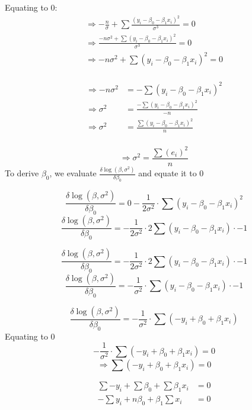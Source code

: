 \documentclass[
]{article}
\begin{document}
Equating to \(0\): \begin{align*}
  \Rightarrow -\frac{n}{\sigma} + \sum \frac{(y_i - \beta_0 - \beta_1 x_i)^2}{\sigma^3}
   =
  0 \\
  \Rightarrow \frac{-n\sigma^2  + \sum (y_i - \beta_0 - \beta_1 x_i)^2}{\sigma^3} 
   =
  0 \\
  \Rightarrow -n\sigma^2  + \sum (y_i - \beta_0 - \beta_1 x_i)^2
  =
  0 \\
\end{align*}

\begin{align*}
  \Rightarrow -n\sigma^2  
   & = 
   -\sum (y_i - \beta_0 - \beta_1 x_i)^2 \\
  
  \Rightarrow \sigma^2  
   & =
  \frac{-\sum (y_i - \beta_0 - \beta_1 x_i)^2}{-n} \\
  
  \Rightarrow \sigma^2  
   & =
  \frac{\sum (y_i - \beta_0 - \beta_1 x_i)^2}{n} \\
\end{align*}

\[
\boxed  {\Rightarrow \sigma^2  
    =
  \frac{\sum(e_i)^2}{n}
}
\] To derive \(\beta_0\), we evaluate
\(\frac{\delta\log(\beta,\sigma^2)}{\delta\beta_0}\) and equate it to
\(0\)

\[
\frac{\delta\log(\beta,\sigma^2)}{\delta\beta_0} 
=
0 - \frac{1}{2\sigma^2} \cdot \sum {(y_i - \beta_0 - \beta_1x_i)}^2
\] \[
\frac{\delta\log(\beta,\sigma^2)}{\delta\beta_0} 
=
-\frac{1}{2\sigma^2} \cdot 2\sum {(y_i - \beta_0 - \beta_1x_i)}\cdot -1
\]

\[
\frac{\delta\log(\beta,\sigma^2)}{\delta\beta_0} 
=
-\frac{1}{2\sigma^2} \cdot 2\sum {(y_i - \beta_0 - \beta_1x_i)}\cdot -1
\] \[
\frac{\delta\log(\beta,\sigma^2)}{\delta\beta_0} 
=
-\frac{1}{\sigma^2} \cdot\sum {(y_i - \beta_0 - \beta_1x_i)}\cdot -1
\]

\[
\frac{\delta\log(\beta,\sigma^2)}{\delta\beta_0} 
=
-\frac{1}{\sigma^2} \cdot\sum {(-y_i + \beta_0 + \beta_1x_i)}
\] Equating to \(0\) \[
-\frac{1}{\sigma^2} \cdot\sum {(-y_i + \beta_0 + \beta_1x_i)} = 0
\] \[
\Rightarrow
\sum {(-y_i + \beta_0 + \beta_1x_i)} = 0
\]

\begin{align*} 
  \sum -y_i + \sum\beta_0 + \sum\beta_1x_i & = 0 \\
  
  -\sum y_i + n\beta_0 + \beta_1\sum x_i & = 0
\end{align*}
\end{document}
